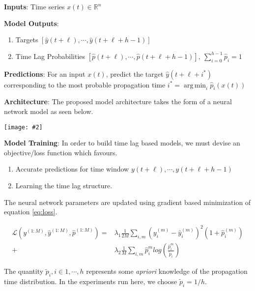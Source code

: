 \documentclass[portrait,a0,final]{a0poster}
\DeclareMathOperator*{\argmin}{arg\,min}
\newcommand{\myfig}[3][0]{
\begin{center}
  \vspace{1.5cm}
  \texttt{[image: \#2]}
  \nobreak\medskip
\end{center}}
\newenvironment{poster}{
  \begin{center}
  \begin{minipage}[c]{0.95\textwidth}
}{
  \end{minipage} 
  \end{center}
}
\begin{document}
\begin{poster}
\begin{multicols}{2}
\textbf{Inputs}: Time series $x(t) \in \mathbb{R}^{n}$ \vspace{0.5\baselineskip}

\textbf{Model Outputs}: 
\begin{enumerate}
\item Targets $[\hat{y}(t+\ell), \cdots, \hat{y}(t+\ell+h-1)]$
\item Time Lag Probabilities $[\hat{p}(t+\ell), \cdots, \hat{p}(t+\ell+h-1)], \ \sum^{h-1}_{i = 0}{\hat{p}_{i}} = 1$
\end{enumerate}

\vspace{0.4\baselineskip}

\textbf{Predictions}: For an input $x(t)$, predict the target $\hat{y}(t + \ell + i^{*})$ corresponding to the most probable propagation time $i^{*} = \argmin_{i}{\hat{p}_i(x(t))}$

\vspace{0.4\baselineskip}

\textbf{Architecture}: The proposed model architecture takes the form of a neural network model as seen below.
\myfig{network}{0.65}

\textbf{Model Training}: In order to build time lag based models, we must devise an objective/loss function which favours.

\begin{enumerate}
    \item Accurate predictions for time window $y(t+\ell), \cdots, y(t+\ell+h-1)$
    \item Learning the time lag structure.
\end{enumerate}


The neural network parameters are updated using gradient based minimization of equation \ref{eq:loss}.


\begin{equation}\label{eq:loss}
\begin{aligned}
\mathcal{L}(y^{(1:M)}, \hat{y}^{(1:M)}, \hat{p}^{(1:M)}) = & \lambda_1 \frac{1}{2M} \sum_{i,m}{(y^{(m)}_{i} - \hat{y}^{(m)}_{i})^2 (1 + \hat{p}^{(m)}_i)} \\ 
+ &\lambda_2 \frac{1}{M} \sum_{i,m}{\hat{p}^{m}_{i} log \left( \frac{\hat{p}^{m}_{i}}{\widetilde{p}_{i}}\right )}
\end{aligned}
\end{equation}

The quantity $\widetilde{p}_i, i \in {1, \cdots, h}$ represents some \emph{apriori} knowledge of the propagation time distribution. In the experiments run here, we choose $\widetilde{p}_i = 1/h$.





\end{multicols}
\end{poster}
\end{document}
